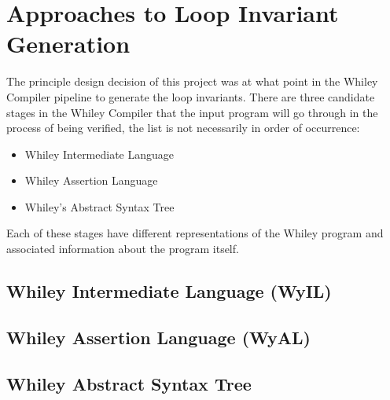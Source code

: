 
\section{Approaches to Loop Invariant Generation}

The principle design decision of this project was at
what point in the Whiley Compiler pipeline
to generate the loop invariants.
There are three candidate stages in the Whiley Compiler
that the input program will go through in the process of
being verified, the list is not necessarily in order of occurrence:

\begin{itemize}
    \item{Whiley Intermediate Language}
    \item{Whiley Assertion Language}
    \item{Whiley's Abstract Syntax Tree}
\end{itemize}

Each of these stages have different representations of the Whiley program and
associated information about the program itself.

\subsection{Whiley Intermediate Language (WyIL)}

\cite{wyil}

\subsection{Whiley Assertion Language (WyAL)}

\subsection{Whiley Abstract Syntax Tree}

